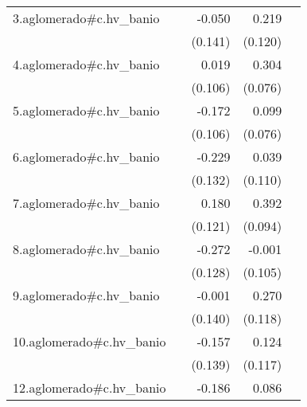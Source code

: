 {\begin{longtable}{l*{4}{D{.}{.}{-1}}}
\addlinespace
3.aglomerado#c.hv\_banio&                     &      -0.050         &       0.219         &                     \\
            &                     &     (0.141)         &     (0.120)         &                     \\
\addlinespace
4.aglomerado#c.hv\_banio&                     &       0.019         &       0.304\sym{***}&                     \\
            &                     &     (0.106)         &     (0.076)         &                     \\
\addlinespace
5.aglomerado#c.hv\_banio&                     &      -0.172         &       0.099         &                     \\
            &                     &     (0.106)         &     (0.076)         &                     \\
\addlinespace
6.aglomerado#c.hv\_banio&                     &      -0.229         &       0.039         &                     \\
            &                     &     (0.132)         &     (0.110)         &                     \\
\addlinespace
7.aglomerado#c.hv\_banio&                     &       0.180         &       0.392\sym{***}&                     \\
            &                     &     (0.121)         &     (0.094)         &                     \\
\addlinespace
8.aglomerado#c.hv\_banio&                     &      -0.272\sym{*}  &      -0.001         &                     \\
            &                     &     (0.128)         &     (0.105)         &                     \\
\addlinespace
9.aglomerado#c.hv\_banio&                     &      -0.001         &       0.270\sym{*}  &                     \\
            &                     &     (0.140)         &     (0.118)         &                     \\
\addlinespace
10.aglomerado#c.hv\_banio&                     &      -0.157         &       0.124         &                     \\
            &                     &     (0.139)         &     (0.117)         &                     \\
\addlinespace
12.aglomerado#c.hv\_banio&                     &      -0.186         &       0.086         &                     \\

\end{longtable}}

